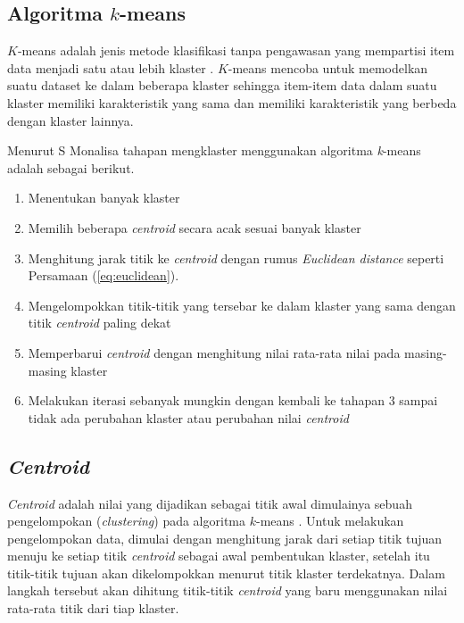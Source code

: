 \subsection{Algoritma $k$-means}

$K$-means adalah jenis metode klasifikasi tanpa pengawasan yang mempartisi item data menjadi satu atau lebih klaster \cite{agusta2007k}. $K$-means mencoba untuk memodelkan suatu dataset ke dalam beberapa klaster sehingga item-item data dalam suatu klaster memiliki karakteristik yang sama dan memiliki karakteristik yang berbeda dengan klaster lainnya.

Menurut S Monalisa \cite{monalisa2018klasterisasi} tahapan mengklaster menggunakan algoritma \textit{k}-means adalah sebagai berikut.

\begin{enumerate}
	\item Menentukan banyak klaster
	\item Memilih beberapa \textit{centroid} secara acak sesuai banyak klaster
	\item Menghitung jarak titik ke \textit{centroid} dengan rumus \textit{Euclidean distance} seperti Persamaan (\ref{eq:euclidean}).
	\item Mengelompokkan titik-titik yang tersebar ke dalam klaster yang sama dengan titik \textit{centroid} paling dekat
	\item Memperbarui \textit{centroid} dengan menghitung nilai rata-rata nilai pada masing-masing klaster
	\item Melakukan iterasi sebanyak mungkin dengan kembali ke tahapan 3 sampai tidak ada perubahan klaster atau perubahan nilai \textit{centroid}
\end{enumerate}

\subsection{\textit{Centroid}}

\textit{Centroid} adalah nilai yang dijadikan sebagai titik awal dimulainya sebuah pengelompokan (\textit{clustering}) pada algoritma $k$-means \cite{retno2019peningkatan}. Untuk melakukan pengelompokan data, dimulai dengan menghitung jarak dari setiap titik tujuan menuju ke setiap titik \textit{centroid} sebagai awal pembentukan klaster, setelah itu titik-titik tujuan akan dikelompokkan menurut titik klaster terdekatnya. Dalam langkah tersebut akan dihitung titik-titik \textit{centroid} yang baru menggunakan nilai rata-rata titik dari tiap klaster.


